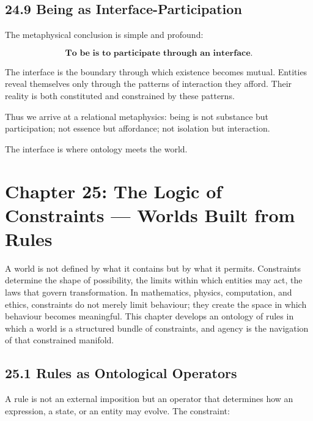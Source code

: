 \documentclass[12pt,letterpaper]{article}
\theoremstyle{remark}
\begin{document}
\subsection{24.9 Being as Interface-Participation}

The metaphysical conclusion is simple and profound:

\[
\textbf{To be is to participate through an interface.}
\]

The interface is the boundary through which existence becomes mutual. Entities reveal themselves only through the patterns of interaction they afford. Their reality is both constituted and constrained by these patterns.

Thus we arrive at a relational metaphysics: being is not substance but participation; not essence but affordance; not isolation but interaction.

The interface is where ontology meets the world.

\newpage
\section{Chapter 25: The Logic of Constraints — Worlds Built from Rules}

A world is not defined by what it contains but by what it permits. Constraints determine the shape of possibility, the limits within which entities may act, the laws that govern transformation. In mathematics, physics, computation, and ethics, constraints do not merely limit behaviour; they create the space in which behaviour becomes meaningful. This chapter develops an ontology of rules in which a world is a structured bundle of constraints, and agency is the navigation of that constrained manifold.

\subsection{25.1 Rules as Ontological Operators}

A rule is not an external imposition but an operator that determines how an expression, a state, or an entity may evolve. The constraint:
\end{document}
